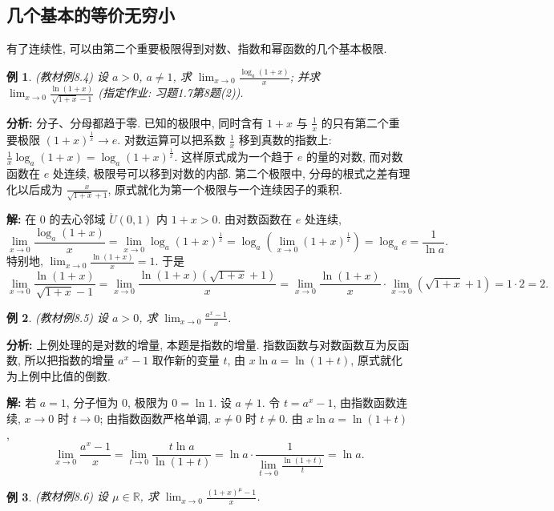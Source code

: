 \documentclass[UTF8,openany]{ctexbook}
\theoremstyle{chinesetextbook}
\newtheorem{example}{例}[section]
\newenvironment{cnsolution}{\par\indent\textbf{解:} \ignorespaces}{\par}
\begin{document}
\subsection{几个基本的等价无穷小}
有了连续性, 可以由第二个重要极限得到对数、指数和幂函数的几个基本极限.
\begin{example}
\textnormal{(教材例8.4)} 设 $a>0$, $a\ne1$, 求 $\displaystyle\lim_{x\to0}\frac{\log_a(1+x)}x$; 并求 $\displaystyle\lim_{x\to0}\frac{\ln(1+x)}{\sqrt{1+x}-1}$ (指定作业: 习题1.7第8题(2)).
\end{example}
\par\indent\textbf{分析:} 分子、分母都趋于零. 已知的极限中, 同时含有 $1+x$ 与 $\displaystyle\frac1x$ 的只有第二个重要极限 $(1+x)^{\frac1x}\to e$. 对数运算可以把系数 $\displaystyle\frac1x$ 移到真数的指数上: $\displaystyle\frac1x\log_a(1+x)=\log_a(1+x)^{\frac1x}$. 这样原式成为一个趋于 $e$ 的量的对数, 而对数函数在 $e$ 处连续, 极限号可以移到对数的内部. 第二个极限中, 分母的根式之差有理化以后成为 $\displaystyle\frac x{\sqrt{1+x}+1}$, 原式就化为第一个极限与一个连续因子的乘积.
\begin{cnsolution}
在 $0$ 的去心邻域 $\mathring U(0,1)$ 内 $1+x>0$. 由对数函数在 $e$ 处连续,
\[
\lim_{x\to0}\frac{\log_a(1+x)}x=\lim_{x\to0}\log_a(1+x)^{\frac1x}=\log_a\left(\lim_{x\to0}(1+x)^{\frac1x}\right)=\log_ae=\frac1{\ln a}.
\]
特别地, $\displaystyle\lim_{x\to0}\frac{\ln(1+x)}x=1$. 于是
\[
\lim_{x\to0}\frac{\ln(1+x)}{\sqrt{1+x}-1}=\lim_{x\to0}\frac{\ln(1+x)\left(\sqrt{1+x}+1\right)}x=\lim_{x\to0}\frac{\ln(1+x)}x\cdot\lim_{x\to0}\left(\sqrt{1+x}+1\right)=1\cdot2=2.
\]
\end{cnsolution}
\begin{example}
\textnormal{(教材例8.5)} 设 $a>0$, 求 $\displaystyle\lim_{x\to0}\frac{a^x-1}x$.
\end{example}
\par\indent\textbf{分析:} 上例处理的是对数的增量, 本题是指数的增量. 指数函数与对数函数互为反函数, 所以把指数的增量 $a^x-1$ 取作新的变量 $t$, 由 $x\ln a=\ln(1+t)$, 原式就化为上例中比值的倒数.
\begin{cnsolution}
若 $a=1$, 分子恒为 $0$, 极限为 $0=\ln1$. 设 $a\ne1$. 令 $t=a^x-1$, 由指数函数连续, $x\to0$ 时 $t\to0$; 由指数函数严格单调, $x\ne0$ 时 $t\ne0$. 由 $x\ln a=\ln(1+t)$,
\[
\lim_{x\to0}\frac{a^x-1}x=\lim_{t\to0}\frac{t\ln a}{\ln(1+t)}=\ln a\cdot\frac1{\displaystyle\lim_{t\to0}\frac{\ln(1+t)}t}=\ln a.
\]
\end{cnsolution}
\begin{example}
\textnormal{(教材例8.6)} 设 $\mu\in\mathbb R$, 求 $\displaystyle\lim_{x\to0}\frac{(1+x)^\mu-1}x$.
\end{example}
\end{document}
